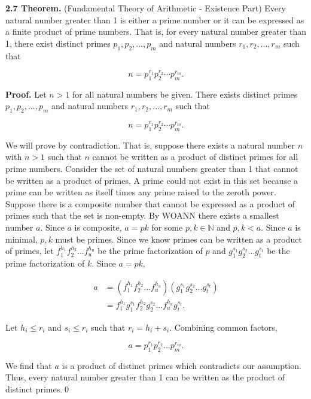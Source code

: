 \documentclass[12pt]{article}
\begin{document}
\noindent\textbf{2.7 Theorem.} (Fundamental Theory of Arithmetic - Existence Part) Every natural number greater than 1 is either a prime number or it can be expressed as a finite product of prime numbers. That is, for every natural number greater than 1, there exist distinct primes $p_{1},p_{2},...,p_{m}$ and natural numbers $r_{1},r_{2},...,r_{m}$ such that

\begin{equation*}
n = p_{1}^{r_{1}} p_{2}^{r_{2}} \cdots p_{m}^{r_{m}}.
\end{equation*}

\noindent\textbf{Proof.} Let $n>1$ for all natural numbers be given. There exists distinct primes $p_{1},p_{2},...,p_{m}$ and natural numbers $r_{1},r_{2},...,r_{m}$ such that

\begin{equation*}
n = p_{1}^{r_{1}} p_{2}^{r_{2}} \cdots p_{m}^{r_{m}}.
\end{equation*}

\noindent We will prove by contradiction. That is, suppose there exists a natural number $n$ with $n>1$ such that $n$ cannot be written as a product of distinct primes for all prime numbers. Consider the set of natural numbers greater than 1 that cannot be written as a product of primes. A prime could not exist in this set because a prime can be written as itself times any prime raised to the zeroth power. Suppose there is a composite number that cannot be expressed as a product of primes such that the set is non-empty. By WOANN there exists a smallest number $a$. Since $a$ is composite, $a=pk$ for some $p,k\in\mathbb{N}$ and $p,k<a$. Since $a$ is minimal, $p,k$ must be primes. Since we know primes can be written as a product of primes, let $f_{1}^{h_{1}}f_{2}^{h_{2}}...f_{u}^{h_{u}}$ be the prime factorization of $p$ and $g_{1}^{s_{1}}g_{2}^{s_{2}}...g_{t}^{s_{t}}$ be the prime factorization of $k$. Since $a=pk$,

\begin{align*}
a &= (f_{1}^{h_{1}}f_{2}^{h_{2}}...f_{u}^{h_{u}})(g_{1}^{s_{1}}g_{2}^{s_{2}}...g_{t}^{s_{t}})\\
&= f_{1}^{h_{1}}g_{1}^{s_{1}}f_{2}^{h_{2}}g_{2}^{s_{2}}...f_{u}^{h_{u}}g_{t}^{s_{t}}.
\end{align*}

\bigskip

\noindent Let $h_{i}\leq r_{i}$ and $s_{i}\leq r_{i}$ such that $r_{i}=h_{i}+s_{i}$. Combining common factors,

\begin{equation*}
a = p_{1}^{r_{1}} p_{2}^{r_{2}} ... p_{m}^{r_{m}}.
\end{equation*}

\noindent We find that $a$ is a product of distinct primes which contradicts our assumption. Thus, every natural number greater than 1 can be written as the product of distinct primes.\qed
\end{document}

